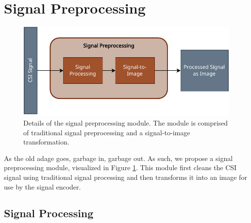 
\section{Signal Preprocessing}\label{sec:methodology-signal-preprocessing}

\begin{figure}
	\centering
	\includegraphics[width=0.8\linewidth]{figures/signal_preprocessing_diagram.pdf}
	\caption{Details of the signal preprocessing module. The module is comprised of traditional signal preprocessing and a signal-to-image transformation.}
	\label{fig:signal-preprocessing-diagram}
\end{figure}

As the old adage goes, garbage in, garbage out.
As such, we propose a signal preprocessing module, visualized in Figure \ref{fig:signal-preprocessing-diagram}.
This module first cleans the CSI signal using traditional signal processing and then transforms it into an image for use by the signal encoder.

\subsection{Signal Processing}

